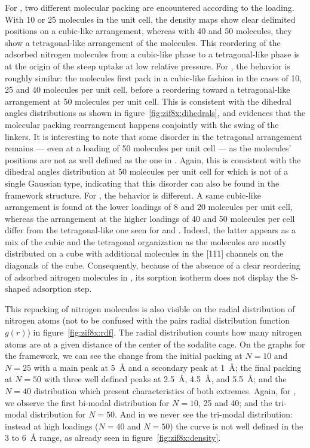 \documentclass[thesis]{subfiles}
\begin{document}
For , two different molecular packing are encountered according to the
loading. With 10 or 25 molecules in the unit cell, the density maps show clear
delimited positions on a cubic-like arrangement, whereas with 40 and 50
molecules, they show a tetragonal-like arrangement of the molecules. This
reordering of the adsorbed nitrogen molecules from a cubic-like phase to a
tetragonal-like phase is at the origin of the steep uptake at low relative
pressure. For \ZIFCl, the behavior is roughly similar: the molecules first pack
in a cubic-like fashion in the cases of 10, 25 and 40 molecules per unit cell,
before a reordering toward a tetragonal-like arrangement at 50 molecules per
unit cell. This is consistent with the dihedral angles distributions as shown in
figure~\ref{fig:zif8x:dihedrals}, and evidences that the molecular packing
rearrangement happens conjointly with the swing of the linkers. It is
interesting to note that some disorder in the tetragonal arrangement remains ---
even at a loading of 50 molecules per unit cell --- as the molecules' positions
are not as well defined as the one in . Again, this is consistent with the
dihedral angles distribution at 50 molecules per unit cell for \ZIFCl which is
not of a single Gaussian type, indicating that this disorder can also be found
in the framework structure. For \ZIFBr, the behavior is different. A same
cubic-like arrangement is found at the lower loadings of 8 and 20 molecules per
unit cell, whereas the arrangement at the higher loadings of 40 and 50 molecules
per cell differ from the tetragonal-like one seen for  and \ZIFCl. Indeed,
the latter appears as a mix of the cubic and the tetragonal organization as the
molecules are mostly distributed on a cube with additional molecules in the
[111] channels on the diagonals of the cube. Consequently, because of the
absence of a clear reordering of adsorbed nitrogen molecules in \ZIFBr, its
sorption isotherm does not display the S-shaped adsorption step.

This repacking of nitrogen molecules is also visible on the radial distribution
of nitrogen atoms (not to be confused with the pairs radial distribution
function $g(r)$) in figure~\ref{fig:zif8x:rdf}. The radial distribution counts
how many nitrogen atoms are at a given distance of the center of the sodalite
cage. On the graphs for the  framework, we can see the change from the
initial packing at $N = 10$ and $N = 25$ with a main peak at \SI{5}{\AA} and a
secondary peak at \SI{1}{\AA}; the final packing at $N = 50$ with three well
defined peaks at \SI{2.5}{\AA}, \SI{4.5}{\AA}, and \SI{5.5}{\AA}; and the $N =
40$ distribution which present characteristics of both extremes. Again, for
\ZIFCl, we observe the first bi-modal distribution for $N = 10$, 25 and 40; and
the tri-modal distribution for $N = 50$. And in \ZIFBr we never see the
tri-modal distribution: instead at high loadings ($N = 40$ and $N = 50$) the
curve is not well defined in the 3 to \SI{6}{\AA} range, as already seen in
figure~\ref{fig:zif8x:density}.
\end{document}
